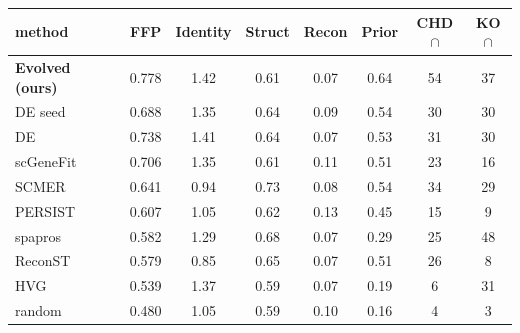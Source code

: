 \begin{tabular}{lccccccc}
\toprule
method & FFP & Identity & Struct & Recon & Prior & CHD$\cap$ & KO$\cap$\\
\midrule
\textbf{Evolved (ours)} & 0.778 & 1.42 & 0.61 & 0.07 & 0.64 & 54 & 37\\
DE seed & 0.688 & 1.35 & 0.64 & 0.09 & 0.54 & 30 & 30\\
\midrule
DE & 0.738 & 1.41 & 0.64 & 0.07 & 0.53 & 31 & 30\\
scGeneFit & 0.706 & 1.35 & 0.61 & 0.11 & 0.51 & 23 & 16\\
SCMER & 0.641 & 0.94 & 0.73 & 0.08 & 0.54 & 34 & 29\\
PERSIST & 0.607 & 1.05 & 0.62 & 0.13 & 0.45 & 15 & 9\\
spapros & 0.582 & 1.29 & 0.68 & 0.07 & 0.29 & 25 & 48\\
ReconST & 0.579 & 0.85 & 0.65 & 0.07 & 0.51 & 26 & 8\\
HVG & 0.539 & 1.37 & 0.59 & 0.07 & 0.19 & 6 & 31\\
random & 0.480 & 1.05 & 0.59 & 0.10 & 0.16 & 4 & 3\\
\bottomrule
\end{tabular}